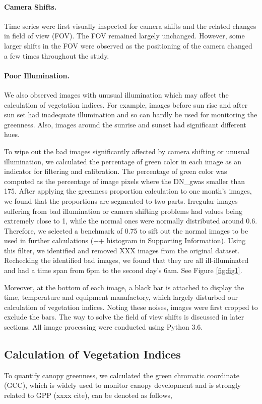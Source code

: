 \documentclass{article}
\begin{document}
\paragraph{Camera Shifts.}Time series were first visually inspected for camera shifts and the related changes in field of view (FOV). The FOV remained largely unchanged. However, some larger shifts in the FOV were observed as the positioning of the camera changed a few times throughout the study. 

\paragraph{Poor Illumination.}We also observed images with unusual illumination which may affect the calculation of vegetation indices. For example, images before sun rise and after sun set had inadequate illumination and so can hardly be used for monitoring the greenness. Also, images around the sunrise and sunset had significant different hues. 


To wipe out the bad images significantly affected by camera shifting or unusual illumination, we calculated the percentage of green color in each image as an indicator for filtering and calibration. The percentage of green color was computed as the percentage of image pixels where the {DN_g}was smaller than 175. After applying the greenness proportion calculation to one month’s images, we found that the proportions are segmented to two parts. Irregular images suffering from bad illumination or camera shifting problems had values being extremely close to 1, while the normal ones were normally distributed around 0.6. Therefore, we selected a benchmark of 0.75 to sift out the normal images to be used in further calculations (++ histogram in Supporting Information). Using this filter, we identified and removed XXX images  from the original dataset. Rechecking the identified bad images, we found that they are all ill-illuminated and had a time span from 6pm to the second day’s 6am. See Figure \ref{fig:fig1}.


Moreover, at the bottom of each image, a black bar is attached to display the time, temperature and equipment manufactory, which largely disturbed our calculation of vegetation indices. Noting these noises, images were first cropped to exclude the bars. The way to solve the field of view shifts is discussed in later sections. All image processing were conducted using Python 3.6. 


\subsection{Calculation of Vegetation Indices}
To quantify canopy greenness, we calculated the green chromatic coordinate (GCC), which is widely used to monitor canopy development and is strongly related to GPP (xxxx cite), can be denoted as follows,
\end{document}
